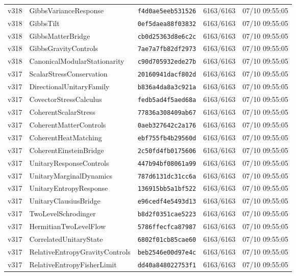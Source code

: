 \documentclass[11pt]{article}
\theoremstyle{definition}\newtheorem{deriv}{Derivação}
\begin{document}
{\begin{longtable}{@{}lllll@{}}
v318 & GibbsVarianceResponse & \texttt{f4d0ae5eeb531526} & 6163/6163 & 07/10 09:55:05 \\
v318 & GibbsTilt & \texttt{0ef5daea88f03832} & 6163/6163 & 07/10 09:55:05 \\
v318 & GibbsMatterBridge & \texttt{cb0d25363d8e6c2c} & 6163/6163 & 07/10 09:55:05 \\
v318 & GibbsGravityControls & \texttt{7ae7a7fb82df2973} & 6163/6163 & 07/10 09:55:05 \\
v318 & CanonicalModularStationarity & \texttt{c90d705932ede27b} & 6163/6163 & 07/10 09:55:05 \\
v317 & ScalarStressConservation & \texttt{20160941dacf802d} & 6163/6163 & 07/10 09:55:05 \\
v317 & DirectionalUnitaryFamily & \texttt{b836a4da8a3c921a} & 6163/6163 & 07/10 09:55:05 \\
v317 & CovectorStressCalculus & \texttt{fedb5ad4f5aed68a} & 6163/6163 & 07/10 09:55:05 \\
v317 & CoherentScalarStress & \texttt{77836a308409ab67} & 6163/6163 & 07/10 09:55:05 \\
v317 & CoherentMatterControls & \texttt{0aeb327642c2a176} & 6163/6163 & 07/10 09:55:05 \\
v317 & CoherentHeatMatching & \texttt{ebf755fb4b29560d} & 6163/6163 & 07/10 09:55:05 \\
v317 & CoherentEinsteinBridge & \texttt{2c50fd4fb0175606} & 6163/6163 & 07/10 09:55:05 \\
v317 & UnitaryResponseControls & \texttt{447b94bf08061a99} & 6163/6163 & 07/10 09:55:05 \\
v317 & UnitaryMarginalDynamics & \texttt{787d6131dc31cc6a} & 6163/6163 & 07/10 09:55:05 \\
v317 & UnitaryEntropyResponse & \texttt{136915bb5a1bf522} & 6163/6163 & 07/10 09:55:05 \\
v317 & UnitaryClausiusBridge & \texttt{e96cedf4e5493d13} & 6163/6163 & 07/10 09:55:05 \\
v317 & TwoLevelSchrodinger & \texttt{b8d2f0351cae5223} & 6163/6163 & 07/10 09:55:05 \\
v317 & HermitianTwoLevelFlow & \texttt{5786ffecfca87987} & 6163/6163 & 07/10 09:55:05 \\
v317 & CorrelatedUnitaryState & \texttt{6802f01cb85cae60} & 6163/6163 & 07/10 09:55:05 \\
v317 & RelativeEntropyGravityControls & \texttt{beb2546e00d97e4c} & 6163/6163 & 07/10 09:55:05 \\
v317 & RelativeEntropyFisherLimit & \texttt{dd40a848022753f1} & 6163/6163 & 07/10 09:55:05 \\

\end{longtable}}
\end{document}
